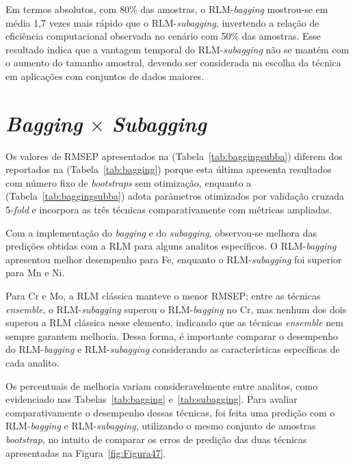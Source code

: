 Em termos absolutos, com 80\% das amostras, o RLM-\textit{bagging} mostrou-se 
em média 1,7 vezes mais rápido que o RLM-\textit{subagging}, invertendo a 
relação de eficiência computacional observada no cenário com 50\% das amostras. 
Esse resultado indica que a vantagem temporal do RLM-\textit{subagging} não se 
mantém com o aumento do tamanho amostral, devendo ser considerada na escolha 
da técnica em aplicações com conjuntos de dados maiores.

\section{\textit{Bagging} $\times$ \textit{Subagging}}
\label{sec:bagxsuagg}

Os valores de RMSEP apresentados na (Tabela~\ref{tab:baggingsubba}) diferem dos reportados na (Tabela~\ref{tab:bagging}) porque esta última apresenta resultados com número fixo de \textit{bootstraps} sem otimização, enquanto a (Tabela~\ref{tab:baggingsubba}) adota parâmetros otimizados por validação cruzada 5-\textit{fold} e incorpora as três técnicas comparativamente com métricas ampliadas.

Com a implementação do \textit{bagging} e do \textit{subagging}, observou-se melhora das predições obtidas com a RLM para alguns analitos específicos. O RLM-\textit{bagging} apresentou melhor desempenho para Fe, enquanto o RLM-\textit{subagging} foi superior para Mn e Ni.

Para Cr e Mo, a RLM clássica manteve o menor RMSEP; entre as técnicas \textit{ensemble}, o RLM-\textit{subagging} superou o RLM-\textit{bagging} no Cr, mas nenhum dos dois superou a RLM clássica nesse elemento, indicando que as técnicas \textit{ensemble} nem sempre garantem melhoria. Dessa forma, é importante comparar o desempenho do RLM-\textit{bagging} e RLM-\textit{subagging} considerando as características específicas de cada analito.


Os percentuais de melhoria variam consideravelmente entre analitos, como evidenciado nas Tabelas~\ref{tab:bagging} e~\ref{tab:subagging}.
Para avaliar comparativamente o desempenho dessas técnicas, foi feita uma predição com o RLM-\textit{bagging} e RLM-\textit{subagging}, utilizando o mesmo conjunto de amostras \textit{bootstrap}, no intuito de comparar os erros de predição das duas técnicas apresentadas na Figura~\ref{fig:Figura47}.


